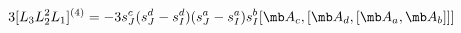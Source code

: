 \begin{equation}
3[L_3L_2^2L_1]^{(4)}=-3s_{J}^{c} (s_{J}^{d}-s_I^d) ( s_{J}^{a}-s_I^a) s_I^b [{\mb A}_c,[{\mb A}_d,[{\mb A}_a,{\mb A}_b]]]
\end{equation}


